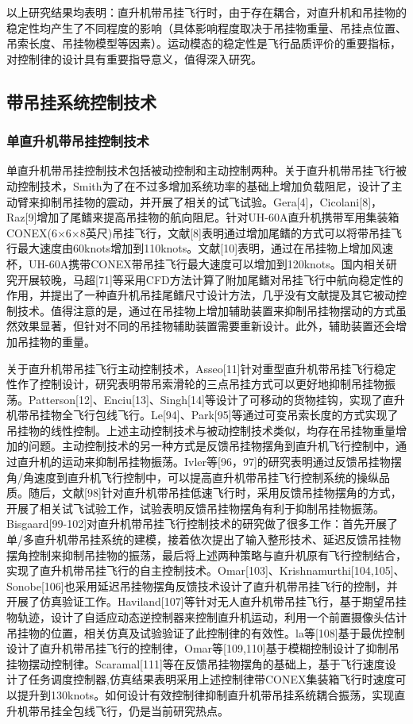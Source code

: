 以上研究结果均表明：直升机带吊挂飞行时，由于存在耦合，对直升机和吊挂物的稳定性均产生了不同程度的影响（具体影响程度取决于吊挂物重量、吊挂点位置、吊索长度、吊挂物模型等因素）。运动模态的稳定性是飞行品质评价的重要指标，对控制律的设计具有重要指导意义，值得深入研究。

\subsection{带吊挂系统控制技术}
\subsubsection{单直升机带吊挂控制技术}
单直升机带吊挂控制技术包括被动控制和主动控制两种。关于直升机带吊挂飞行被动控制技术，Smith为了在不过多增加系统功率的基础上增加负载阻尼，设计了主动臂来抑制吊挂物的震动，并开展了相关的试飞试验。Gera[4]，Cicolani[8]，Raz[9]增加了尾鳍来提高吊挂物的航向阻尼。针对UH-60A直升机携带军用集装箱CONEX(6×6×8英尺)吊挂飞行，文献[8]表明通过增加尾鳍的方式可以将带吊挂飞行最大速度由60knots增加到110knots。文献[10]表明，通过在吊挂物上增加风速杯，UH-60A携带CONEX带吊挂飞行最大速度可以增加到120knots。国内相关研究开展较晚，马超[71]等采用CFD方法计算了附加尾鳍对吊挂飞行中航向稳定性的作用，并提出了一种直升机吊挂尾鳍尺寸设计方法，几乎没有文献提及其它被动控制技术。值得注意的是，通过在吊挂物上增加辅助装置来抑制吊挂物摆动的方式虽然效果显著，但针对不同的吊挂物辅助装置需要重新设计。此外，辅助装置还会增加吊挂物的重量。

关于直升机带吊挂飞行主动控制技术，Asseo[11]针对重型直升机带吊挂飞行稳定性作了控制设计，研究表明带吊索滑轮的三点吊挂方式可以更好地抑制吊挂物振荡。Patterson[12]、Enciu[13]、Singh[14]等设计了可移动的货物挂钩，实现了直升机带吊挂物全飞行包线飞行。Le[94]、Park[95]等通过可变吊索长度的方式实现了吊挂物的线性控制。上述主动控制技术与被动控制技术类似，均存在吊挂物重量增加的问题。主动控制技术的另一种方式是反馈吊挂物摆角到直升机飞行控制中，通过直升机的运动来抑制吊挂物振荡。Ivler等[96，97]的研究表明通过反馈吊挂物摆角/角速度到直升机飞行控制中，可以提高直升机带吊挂飞行控制系统的操纵品质。随后，文献[98]针对直升机带吊挂低速飞行时，采用反馈吊挂物摆角的方式，开展了相关试飞试验工作，试验表明反馈吊挂物摆角有利于抑制吊挂物振荡。Bisgaard[99-102]对直升机带吊挂飞行控制技术的研究做了很多工作：首先开展了单/多直升机带吊挂系统的建模，接着依次提出了输入整形技术、延迟反馈吊挂物摆角控制来抑制吊挂物的振荡，最后将上述两种策略与直升机原有飞行控制结合，实现了直升机带吊挂飞行的自主控制技术。Omar[103]、Krishnamurthi[104,105]、Sonobe[106]也采用延迟吊挂物摆角反馈技术设计了直升机带吊挂飞行的控制，并开展了仿真验证工作。Haviland[107]等针对无人直升机带吊挂飞行，基于期望吊挂物轨迹，设计了自适应动态逆控制器来控制直升机运动，利用一个前置摄像头估计吊挂物的位置，相关仿真及试验验证了此控制律的有效性。la等[108]基于最优控制设计了直升机带吊挂飞行的控制律，Omar等[109,110]基于模糊控制设计了抑制吊挂物摆动控制律。Scaramal[111]等在反馈吊挂物摆角的基础上，基于飞行速度设计了任务调度控制器,仿真结果表明采用上述控制律带CONEX集装箱飞行时速度可以提升到130knots。如何设计有效控制律抑制直升机带吊挂系统耦合振荡，实现直升机带吊挂全包线飞行，仍是当前研究热点。

